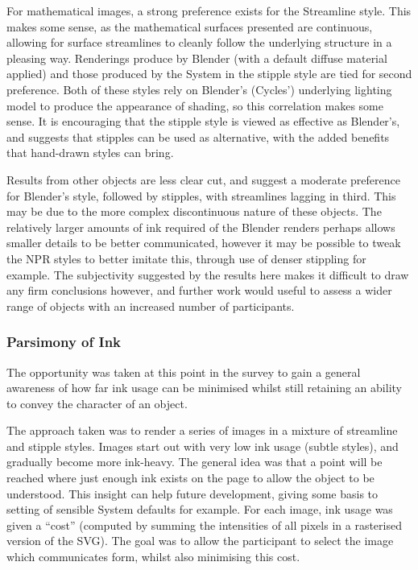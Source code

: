 For mathematical images, a strong preference exists for the Streamline style.
This makes some sense, as the mathematical surfaces presented are continuous, allowing for surface streamlines to cleanly follow the underlying structure in a pleasing way.
Renderings produce by Blender (with a default diffuse material applied) and those produced by the System in the stipple style are tied for second preference.
Both of these styles rely on Blender's (Cycles') underlying lighting model to produce the appearance of shading, so this correlation makes some sense.
It is encouraging that the stipple style is viewed as effective as Blender's, and suggests that stipples can be used as alternative, with the added benefits that hand-drawn styles can bring.

Results from other objects are less clear cut, and suggest a moderate preference for Blender's style, followed by stipples, with streamlines lagging in third.
This may be due to the more complex discontinuous nature of these objects.
The relatively larger amounts of ink required of the Blender renders perhaps allows smaller details to be better communicated, however it may be possible to tweak the NPR styles to better imitate this, through use of denser stippling for example.
The subjectivity suggested by the results here makes it difficult to draw any firm conclusions however, and further work would useful to assess a wider range of objects with an increased number of participants.

\subsubsection{Parsimony of Ink}

The opportunity was taken at this point in the survey to gain a general awareness of how far ink usage can be minimised whilst still retaining an ability to convey the character of an object.

The approach taken was to render a series of images in a mixture of streamline and stipple styles. 
Images start out with very low ink usage (subtle styles), and gradually become more ink-heavy.
The general idea was that a point will be reached where just enough ink exists on the page to allow the object to be understood.
This insight can help future development, giving some basis to setting of sensible System defaults for example.
For each image, ink usage was given a ``cost'' (computed by summing the intensities of all pixels in a rasterised version of the SVG).
The goal was to allow the participant to select the image which communicates form, whilst also minimising this cost.

